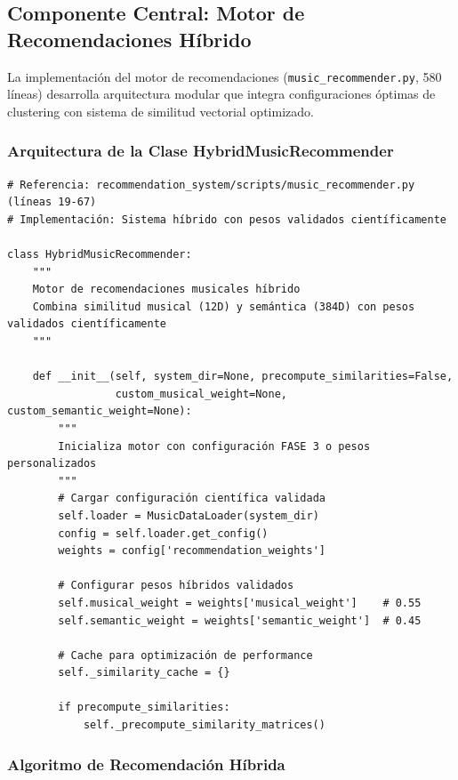 \documentclass[12pt,a4paper]{article}
\begin{document}
\subsection{Componente Central: Motor de Recomendaciones Híbrido}

La implementación del motor de recomendaciones (\texttt{music\_recommender.py}, 580 líneas) desarrolla arquitectura modular que integra configuraciones óptimas de clustering con sistema de similitud vectorial optimizado.

\subsubsection{Arquitectura de la Clase HybridMusicRecommender}

\begin{lstlisting}[caption={Arquitectura Principal del Sistema Híbrido}]
# Referencia: recommendation_system/scripts/music_recommender.py (líneas 19-67)
# Implementación: Sistema híbrido con pesos validados científicamente

class HybridMusicRecommender:
    """
    Motor de recomendaciones musicales híbrido
    Combina similitud musical (12D) y semántica (384D) con pesos validados científicamente
    """

    def __init__(self, system_dir=None, precompute_similarities=False,
                 custom_musical_weight=None, custom_semantic_weight=None):
        """
        Inicializa motor con configuración FASE 3 o pesos personalizados
        """
        # Cargar configuración científica validada
        self.loader = MusicDataLoader(system_dir)
        config = self.loader.get_config()
        weights = config['recommendation_weights']

        # Configurar pesos híbridos validados
        self.musical_weight = weights['musical_weight']    # 0.55
        self.semantic_weight = weights['semantic_weight']  # 0.45

        # Cache para optimización de performance
        self._similarity_cache = {}

        if precompute_similarities:
            self._precompute_similarity_matrices()
\end{lstlisting}

\subsubsection{Algoritmo de Recomendación Híbrida}
\end{document}
